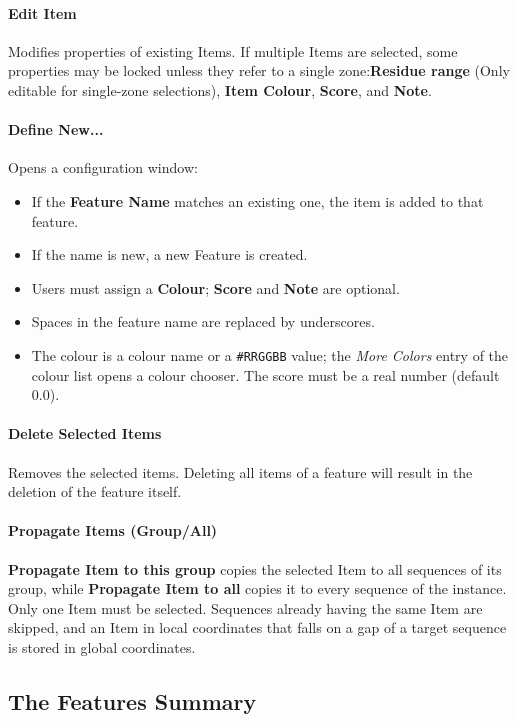 \documentclass[a4paper]{article}
\begin{document}
\paragraph{Edit Item}
Modifies properties of existing Items. If multiple Items are selected, some properties may be locked unless they refer to a single zone:\textbf{Residue range} (Only editable for single-zone selections), \textbf{Item Colour}, \textbf{Score}, and \textbf{Note}.

\paragraph{Define New...}
Opens a configuration window:
\begin{itemize}
    \item If the \textbf{Feature Name} matches an existing one, the item is added to that feature.
    \item If the name is new, a new Feature is created.
    \item Users must assign a \textbf{Colour}; \textbf{Score} and \textbf{Note} are optional.
    \item Spaces in the feature name are replaced by underscores.
    \item The colour is a colour name or a \texttt{\#RRGGBB} value; the \textit{More Colors} entry of the colour list opens a colour chooser. The score must be a real number (default 0.0).
\end{itemize}

\paragraph{Delete Selected Items}
Removes the selected items. Deleting all items of a feature will result in the deletion of the feature itself.

\paragraph{Propagate Items (Group/All)}
\textbf{Propagate Item to this group} copies the selected Item to all sequences of its group, while \textbf{Propagate Item to all} copies it to every sequence of the instance. Only one Item must be selected. Sequences already having the same Item are skipped, and an Item in local coordinates that falls on a gap of a target sequence is stored in global coordinates.


\subsection{The Features Summary}
\label{tool-featsummary}
\end{document}
